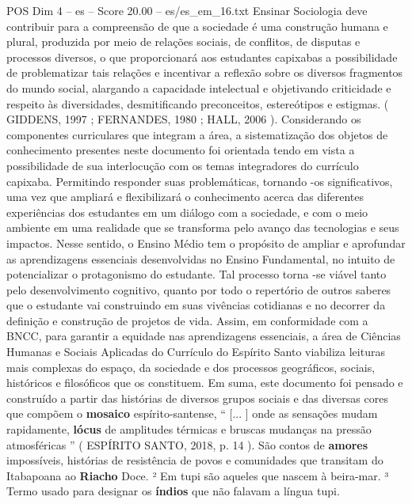 \begin{textsample}{POS Dim 4 – es – Score 20.00 – es/es\_em\_16.txt}
Ensinar Sociologia deve contribuir para a compreensão de que a sociedade é uma construção humana e plural, produzida por meio de relações sociais, de conflitos, de disputas e processos diversos, o que proporcionará aos estudantes capixabas a possibilidade de problematizar tais relações e incentivar a reflexão sobre os diversos fragmentos do mundo social, alargando a capacidade intelectual e objetivando criticidade e respeito às diversidades, desmitificando preconceitos, estereótipos e estigmas. ( GIDDENS, 1997 ; FERNANDES, 1980 ; HALL, 2006 ).
Considerando os componentes curriculares que integram a área, a sistematização dos objetos de conhecimento presentes neste documento foi orientada tendo em vista a possibilidade de sua interlocução com os temas integradores do currículo capixaba.
Permitindo responder suas problemáticas, tornando -os significativos, uma vez que ampliará e flexibilizará o conhecimento acerca das diferentes experiências dos estudantes em um diálogo com a sociedade, e com o meio ambiente em uma realidade que se transforma pelo avanço das tecnologias e seus impactos.
Nesse sentido, o Ensino Médio tem o propósito de ampliar e aprofundar as aprendizagens essenciais desenvolvidas no Ensino Fundamental, no intuito de potencializar o protagonismo do estudante.
Tal processo torna -se viável tanto pelo desenvolvimento cognitivo, quanto por todo o repertório de outros saberes que o estudante vai construindo em suas vivências cotidianas e no decorrer da definição e construção de projetos de vida.
Assim, em conformidade com a BNCC, para garantir a equidade nas aprendizagens essenciais, a área de Ciências Humanas e Sociais Aplicadas do Currículo do Espírito Santo viabiliza leituras mais complexas do espaço, da sociedade e dos processos geográficos, sociais, históricos e filosóficos que os constituem.
Em suma, este documento foi pensado e construído a partir das histórias de diversos grupos sociais e das diversas cores que compõem o \textbf{mosaico} espírito-santense, “ [... ] onde as sensações mudam rapidamente, \textbf{lócus} de amplitudes térmicas e bruscas mudanças na pressão atmosféricas ” ( ESPÍRITO SANTO, 2018, p. 14 ).
São contos de \textbf{amores} impossíveis, histórias de resistência de povos e comunidades que transitam do Itabapoana ao \textbf{Riacho} Doce. ² Em tupi são aqueles que nascem à beira-mar. ³ Termo usado para designar os \textbf{índios} que não falavam a língua tupi.

\end{textsample}
